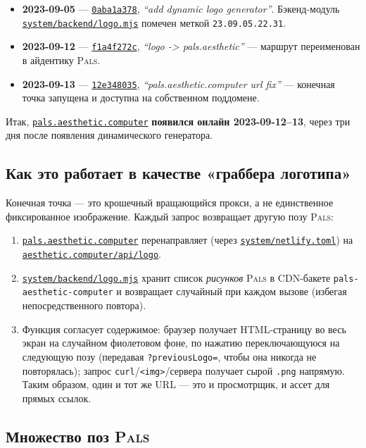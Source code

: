 \documentclass[10pt,letterpaper,twocolumn]{article}
\newcommand{\pals}{\textsc{Pals}}
\newcommand{\commit}[2]{\href{https://github.com/whistlegraph/aesthetic-computer/commit/#1}{\texttt{#1}}, \emph{``#2''}}
\newcommand{\repofile}[1]{\href{https://github.com/whistlegraph/aesthetic-computer/blob/main/#1}{\texttt{#1}}}
\begin{document}
\begin{itemize}
  \item \textbf{2023-09-05} --- \commit{0aba1a378}{add dynamic logo
        generator}. Бэкенд-модуль \repofile{system/backend/logo.mjs}
        помечен меткой \texttt{23.09.05.22.31}.
  \item \textbf{2023-09-12} --- \commit{f1a4f272c}{logo -> pals.aesthetic}
        --- маршрут переименован в айдентику \pals{}.
  \item \textbf{2023-09-13} --- \commit{12e348035}{pals.aesthetic.computer
        url fix} --- конечная точка запущена и доступна на собственном
        поддомене.
\end{itemize}

\noindent Итак, \href{https://pals.aesthetic.computer}{\texttt{pals.aesthetic.computer}}
\textbf{появился онлайн 2023-09-12--13}, через три дня после появления
динамического генератора.

\subsection{Как это работает в качестве «граббера логотипа»}

Конечная точка --- это крошечный вращающийся прокси, а не единственное
фиксированное изображение. Каждый запрос возвращает другую позу \pals{}:

\begin{enumerate}
  \item \href{https://pals.aesthetic.computer}{\texttt{pals.aesthetic.computer}}
        перенаправляет (через \repofile{system/netlify.toml}) на
        \href{https://aesthetic.computer/api/logo}{\texttt{aesthetic.computer/api/logo}}.
  \item \repofile{system/backend/logo.mjs} хранит список \emph{рисунков}
        \pals{} в CDN-бакете \texttt{pals-aesthetic-computer} и возвращает
        случайный при каждом вызове (избегая непосредственного повтора).
  \item Функция согласует содержимое: браузер получает HTML-страницу во
        весь экран на случайном фиолетовом фоне, по нажатию
        переключающуюся на следующую позу (передавая
        \texttt{?previousLogo=}, чтобы она никогда не повторялась); запрос
        \texttt{curl}/\texttt{<img>}/сервера получает сырой \texttt{.png}
        напрямую. Таким образом, один и тот же URL --- это и просмотрщик,
        и ассет для прямых ссылок.
\end{enumerate}

\subsection{Множество поз \pals{}}
\end{document}
